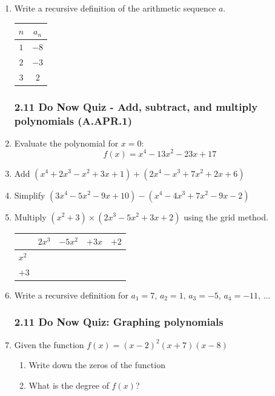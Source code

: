 \documentclass[12pt, twoside]{article}
\begin{document}
\begin{enumerate}[itemsep=1.5cm]
\item Write a recursive definition of the arithmetic sequence $a$. \\[0.5cm]
    \begin{tabular}{|c|c|}
    \hline
    $n$ & $a_n$ \\
    \hline
    $1$ & $-8$ \\
    $2$ & $-3$ \\
    $3$ & $2$ \\
    \hline
    \end{tabular}

\newpage
\subsubsection*{2.11 Do Now Quiz - Add, subtract, and multiply polynomials (A.APR.1)}
\setcounter{enumi}{0}
\item Evaluate the polynomial for $x=0$:
\[f(x) = x^4-13x^2 - 23x + 17\]

\item Add $(x^4+2x^3-x^2 + 3x + 1)+(2x^4-x^3+7x^2 + 2x + 6)$

\item Simplify $(3x^4-5x^2 -9x + 10)-(x^4-4x^3+7x^2 -9x - 2)$

\item Multiply $(x^2+3) \times (2x^3-5x^2+3x+2)$ using the grid method.\\[0.5cm]
    \renewcommand{\arraystretch}{2}
    \begin{tabular}{|p{0.5cm}|p{2cm}|p{2cm}|p{2cm}|p{2cm}|}
        \hline
        & $2x^3$ & $-5x^2$ & $+3x$ & $+2$ \\
        \hline
        $x^2$ & & & & \\
        \hline
        $+3$ & & & & \\
        \hline
    \end{tabular}

\item Write a recursive definition for $a_1 = 7$, $a_2 = 1$, $a_3 = -5$, $a_4 = -11$, $\ldots$

\newpage
\subsubsection*{2.11 Do Now Quiz: Graphing polynomials}
\setcounter{enumi}{0}
\item Given the function $f(x)=(x-2)^2 (x+7)(x-8)$
    \begin{enumerate}
        \item Write down the zeros of the function \\[0.25cm]
        \item What is the degree of $f(x)$?
    \end{enumerate}


\end{enumerate}
\end{document}
